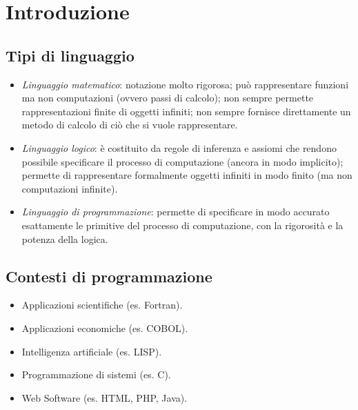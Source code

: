 \documentclass[a4paper,oneside,titlepage]{book}
\begin{document}
\begin{frontespizio}
\end{frontespizio}

\frontmatter
\tableofcontents

\mainmatter

\chapter{Introduzione}

\section{Tipi di linguaggio}
\begin{itemize}
	\item \textit{Linguaggio matematico}: notazione molto rigorosa; può rappresentare funzioni ma non computazioni (ovvero passi di calcolo); non sempre permette rappresentazioni finite di oggetti infiniti; non sempre fornisce direttamente un metodo di calcolo di ciò che si vuole rappresentare.
	\item \textit{Linguaggio logico}: è costituito da regole di inferenza e assiomi che rendono possibile specificare il processo di computazione (ancora in modo implicito); permette di rappresentare formalmente oggetti infiniti in modo finito (ma non computazioni infinite).
	\item \textit{Linguaggio di programmazione}: permette di specificare in modo accurato esattamente le primitive del processo di computazione, con la rigorosità e la potenza della logica.
\end{itemize}

\section{Contesti di programmazione}
\begin{itemize}
	\item Applicazioni scientifiche (es. Fortran).
	\item Applicazioni economiche (es. COBOL).
	\item Intelligenza artificiale (es. LISP).
	\item Programmazione di sistemi (es. C).
	\item Web Software (es. HTML, PHP, Java).
\end{itemize}
\end{document}
